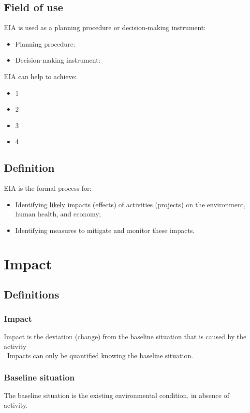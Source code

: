 \documentclass{article}
\newcommand{\tra}{\textrightarrow\ }
\begin{document}
\subsection{Field of use}
EIA is used as a planning procedure or decision-making instrument:
\begin{itemize}
    \item Planning procedure:
    \item Decision-making instrument: 
\end{itemize}

EIA can help to achieve:
\begin{itemize}
    \item 1
    \item 2
    \item 3
    \item 4
\end{itemize}

\subsection{Definition}
EIA is the formal process for:
\begin{itemize}
    \item Identifying \underline{likely} impacts (effects) of activities
    (projects) on the environment, human health, and economy;
    \item Identifying measures to mitigate and monitor these impacts.
\end{itemize}

\section{Impact}
\subsection{Definitions}
\subsubsection{Impact}
Impact is the deviation (change) from the baseline situation that
is caused by the activity\\
\tra Impacts can only be quantified knowing the baseline situation.

\subsubsection{Baseline situation}
The baseline situation is the existing environmental condition, in absence of activity.
\end{document}
